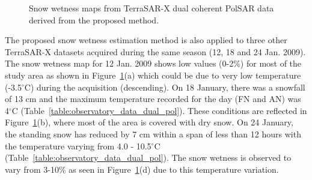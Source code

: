 \begin{figure}[!htbp]
	\caption [Snow wetness maps from TerraSAR-X dual coherent PolSAR data]{Snow wetness maps from TerraSAR-X dual coherent PolSAR data derived from the proposed method.} 
	\label{fig:proposed_results_dualpol}
\end{figure}

The proposed snow wetness estimation method is also applied to three other TerraSAR-X datasets acquired during the same season (12, 18 and 24 Jan. 2009). The snow wetness map for 12 Jan. 2009 shows low values (0-2$\%$) for most of the study area as shown in Figure~\ref{fig:proposed_results_dualpol}(a) which could be due to very low temperature (-3.5$^\circ$C) during the acquisition (descending). On 18 January, there was a snowfall of 13 cm and the maximum temperature recorded for the day (FN and AN) was 4$^\circ$C (Table~\ref{table:observatory_data_dual_pol}). These conditions are reflected in Figure~\ref{fig:proposed_results_dualpol}(b), where most of the area is covered with dry snow. On 24 January, the standing snow has reduced by 7 cm within a span of less than 12 hours with the temperature varying from 4.0 - 10.5$^\circ$C (Table~\ref{table:observatory_data_dual_pol}). The snow wetness is observed to vary from 3-10$\%$ as seen in Figure~\ref{fig:proposed_results_dualpol}(d) due to this temperature variation.


